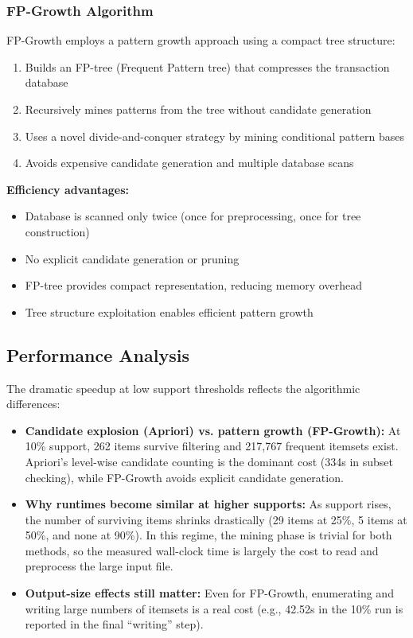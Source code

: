 \documentclass[11pt]{article}
\begin{document}
\subsubsection{FP-Growth Algorithm}

FP-Growth employs a pattern growth approach using a compact tree structure:

\begin{enumerate}
    \item Builds an FP-tree (Frequent Pattern tree) that compresses the transaction database
    \item Recursively mines patterns from the tree without candidate generation
    \item Uses a novel divide-and-conquer strategy by mining conditional pattern bases
    \item Avoids expensive candidate generation and multiple database scans
\end{enumerate}

\textbf{Efficiency advantages:}
\begin{itemize}
    \item Database is scanned only twice (once for preprocessing, once for tree construction)
    \item No explicit candidate generation or pruning
    \item FP-tree provides compact representation, reducing memory overhead
    \item Tree structure exploitation enables efficient pattern growth
\end{itemize}

\subsection{Performance Analysis}

The dramatic speedup at low support thresholds reflects the algorithmic differences:

\begin{itemize}
    \item \textbf{Candidate explosion (Apriori) vs. pattern growth (FP-Growth):} At 10\% support, 262 items survive filtering and 217,767 frequent itemsets exist. Apriori's level-wise candidate counting is the dominant cost (334s in subset checking), while FP-Growth avoids explicit candidate generation.
    \item \textbf{Why runtimes become similar at higher supports:} As support rises, the number of surviving items shrinks drastically (29 items at 25\%, 5 items at 50\%, and none at 90\%). In this regime, the mining phase is trivial for both methods, so the measured wall-clock time is largely the cost to read and preprocess the large input file.
    \item \textbf{Output-size effects still matter:} Even for FP-Growth, enumerating and writing large numbers of itemsets is a real cost (e.g., 42.52s in the 10\% run is reported in the final ``writing'' step).
\end{itemize}
\end{document}
